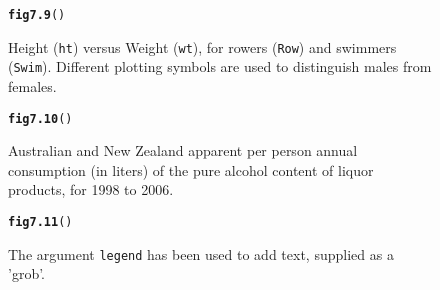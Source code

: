\documentclass[12pt, a4paper,  BCOR=8.25mm, DIV=15]{scrartcl}\usepackage[]{graphicx}\usepackage[]{color}
\makeatletter
\newcommand{\hlstd}[1]{\textcolor[rgb]{0.345,0.345,0.345}{#1}}%
\newcommand{\hlkwd}[1]{\textcolor[rgb]{0.737,0.353,0.396}{\textbf{#1}}}%
\newenvironment{kframe}{%
 \def\at@end@of@kframe{}%
 \ifinner\ifhmode%
  \def\at@end@of@kframe{\end{minipage}}%
  \begin{minipage}{\columnwidth}%
 \fi\fi%
 \def\FrameCommand##1{\hskip\@totalleftmargin \hskip-\fboxsep
 \colorbox{shadecolor}{##1}\hskip-\fboxsep
     \hskip-\linewidth \hskip-\@totalleftmargin \hskip\columnwidth}%
 \MakeFramed {\advance\hsize-\width
   \@totalleftmargin\z@ \linewidth\hsize
   \@setminipage}}%
 {\par\unskip\endMakeFramed%
 \at@end@of@kframe}
\newenvironment{knitrout}{}{} %
\newcommand{\txtt}[1]{{\texttt{#1}}}
\makeatother
\begin{document}
\begin{figure}[ht]
\begin{knitrout}
\color{fgcolor}\begin{kframe}
\begin{alltt}
\hlkwd{fig7.9}\hlstd{()}
\end{alltt}


{\ttfamily\noindent\bfseries{}}\end{kframe}
\end{knitrout}
\caption{Height (\texttt{ht}) versus Weight (\texttt{wt}), for
        rowers (\texttt{Row}) and swimmers (\texttt{Swim}).
        Different plotting symbols are used to distinguish males from
        females.}\label{fig:lattice-ais}
\end{figure}

\begin{figure}[ht]
\begin{knitrout}
\color{fgcolor}\begin{kframe}
\begin{alltt}
\hlkwd{fig7.10}\hlstd{()}
\end{alltt}


{\ttfamily\noindent\bfseries{}}\end{kframe}
\end{knitrout}
\caption{Australian and New Zealand apparent per person annual
  consumption (in liters) of the pure alcohol content of liquor products, for
  1998 to 2006.\label{fig:allgrog}}
\end{figure}

\begin{figure}[ht]
\begin{knitrout}
\color{fgcolor}\begin{kframe}
\begin{alltt}
\hlkwd{fig7.11}\hlstd{()}
\end{alltt}


{\ttfamily\noindent\bfseries{}}\end{kframe}
\end{knitrout}
\caption{The argument \txtt{legend} has been used to add text,
  supplied as a 'grob'.\label{fig:textGrob}}
\end{figure}
\end{document}
